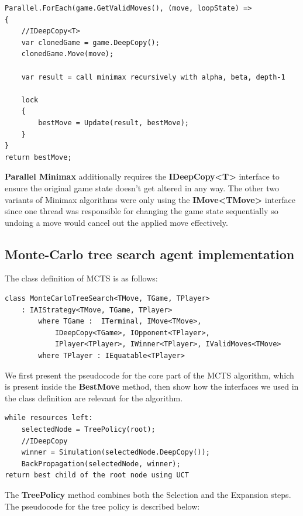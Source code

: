 \begin{lstlisting}
Parallel.ForEach(game.GetValidMoves(), (move, loopState) =>
{
    //IDeepCopy<T>
    var clonedGame = game.DeepCopy();
    clonedGame.Move(move);

    var result = call minimax recursively with alpha, beta, depth-1

    lock
    {
        bestMove = Update(result, bestMove);
    }
}
return bestMove;
\end{lstlisting}


\textbf{Parallel Minimax} additionally requires the \textbf{IDeepCopy\textless{}T\textgreater{}} interface to ensure the original game state doesn't get altered in any way. The other two variants of Minimax algorithms were only using the  \textbf{IMove\textless{}TMove\textgreater{}} interface since one thread was responsible for changing the game state sequentially so undoing a move would cancel out the applied move effectively.

\subsection{Monte-Carlo tree search agent implementation}

The class definition of \gls{MCTS} is as follows:

\begin{lstlisting}
class MonteCarloTreeSearch<TMove, TGame, TPlayer>
    : IAIStrategy<TMove, TGame, TPlayer>
        where TGame :  ITerminal, IMove<TMove>,
            IDeepCopy<TGame>, IOpponent<TPlayer>, 
            IPlayer<TPlayer>, IWinner<TPlayer>, IValidMoves<TMove>
        where TPlayer : IEquatable<TPlayer>
\end{lstlisting}

We first present the pseudocode for the core part of the \gls{MCTS} algorithm, which is present inside the \textbf{BestMove} method, then show how the interfaces we used in the class definition are relevant for the algorithm.

\begin{lstlisting}
while resources left:
    selectedNode = TreePolicy(root);
    //IDeepCopy
    winner = Simulation(selectedNode.DeepCopy());
    BackPropagation(selectedNode, winner);
return best child of the root node using UCT
\end{lstlisting}

The \textbf{TreePolicy} method combines both the Selection and the Expansion steps. The pseudocode for the tree policy is described below:

